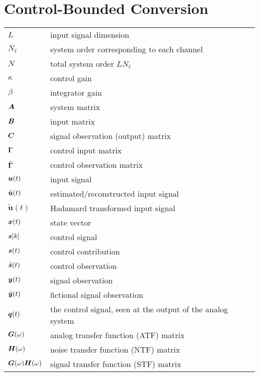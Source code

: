 \section*{Control-Bounded Conversion}
\begin{tabular}{ p{2cm} l }
    $L$         &  input signal dimension \\
    $N_\ell$    &  system order corresponding to each channel \\
    $N$         &  total system order $L N_\ell$ \\
    $\kappa$    &  control gain \\
    $\beta$     &  integrator gain \\
    $\bm{A}$     &  system matrix \\
    $\bm{B}$     &  input matrix \\
    $\bm{C}$     &  signal observation (output) matrix \\
    $\bm{\Gamma}$     &  control input matrix \\
    $\tilde{\bm{\Gamma}}$&  control observation matrix \\
    $\bm{u}(t)$      &  input signal \\
    $\hat{\bm{u}}(t)$   &  estimated/reconstructed input signal \\
    $\tilde{\bm{u}}(t)$   &  Hadamard transformed input signal  \\
    $\bm{x}(t)$      &  state vector \\
    $\bm{s}[k]$      &  control signal \\
    $\bm{s}(t)$      &  control contribution \\
    $\tilde{\bm{s}}(t)$ &  control observation \\
    $\bm{y}(t)$      &  signal observation \\
    $\breve{\bm{y}}(t)$ &  fictional signal observation \\
    $\bm{q}(t)$      &  the control signal, seen at the output of the analog system \\
    $\bm{G}(\omega)$       &  analog transfer function (ATF) matrix \\
    $\bm{H}(\omega)$       &  noise transfer function (NTF) matrix \\
    $\bm{G}(\omega)\bm{H}(\omega)$    &  signal transfer function (STF) matrix \\


\end{tabular}


